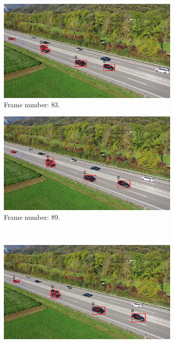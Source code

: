 \begin{figure}[H]
    \centering
    \begin{subfigure}{0.48\textwidth}
        \centering
        \includegraphics[width=\linewidth]{../../../experiments/E1/V2/SAM/83}
        \caption{Frame number: 83.}
        \label{fig:E1-V2-S2:01}
    \end{subfigure}
    \begin{subfigure}{0.48\textwidth}
        \centering
        \includegraphics[width=\linewidth]{../../../experiments/E1/V2/SAM/89}
        \caption{Frame number: 89.}
        \label{fig:E1-V2-S2:02}
    \end{subfigure}
    \\
    \begin{subfigure}{0.48\textwidth}
        \centering
        \includegraphics[width=\linewidth]{../../../experiments/E1/V2/SAM/94}

\end{subfigure}
\end{figure}
